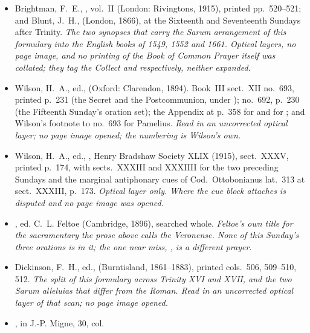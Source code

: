 \begin{itemize}[leftmargin=1.2em, itemsep=0.15em]
{at vatican.va, and at 200~dpi of that transcription rather than of a facsimile.
One witness only: no printing of 1955 was collated, and neither the decree nor
this volume of the  is registered in this repository's sources.}
\item Brightman, F.~E., , vol.~II (London: Rivingtons,
1915), printed pp.~520--521; and Blunt, J.~H.,  (London, 1866), at the Sixteenth and Seventeenth Sundays after
Trinity. \textit{The two synopses that carry the Sarum arrangement of this
formulary into the English books of 1549, 1552 and 1661. Optical layers, no page
image, and no printing of the Book of Common Prayer itself was collated; they
tag the Collect  and 
respectively, neither expanded.}
\item Wilson, H.~A., ed.,  (Oxford: Clarendon,
1894). Book~III sect.~XII no.~693, printed p.~231 (the Secret and the
Postcommunion, under ); no.~692, p.~230 (the Fifteenth
Sunday's oration set); the Appendix at p.~358 for  and for ; and Wilson's footnote to
no.~693 for Pamelius. \textit{Read in an uncorrected optical layer; no page image
opened; the numbering is Wilson's own.}
\item Wilson, H.~A., ed., , Henry Bradshaw Society XLIX (1915), sect.~XXXV, printed p.~174, with
sects.~XXXIII and XXXIIII for the two preceding Sundays and the marginal
antiphonary cues of Cod.~Ottobonianus lat.~313 at sect.~XXXIII, p.~173.
\textit{Optical layer only. Where the cue block attaches is disputed and no page
image was opened.}
\item {}, ed. C.~L. Feltoe (Cambridge, 1896),
searched whole. \textit{Feltoe's own title for the sacramentary the prose above
calls the Veronense. None of this Sunday's three orations is in it; the one
near miss, , is a
different prayer.}
\item Dickinson, F.~H., ed.,  (Burntisland, 1861--1883), printed cols.\ 506, 509--510, 512.
\textit{The split of this formulary across Trinity XVI and XVII, and the two
Sarum alleluias that differ from the Roman. Read in an uncorrected optical layer
of that scan; no page image opened.}
\item {}, in J.-P. Migne,  30, col.\

\end{itemize}
